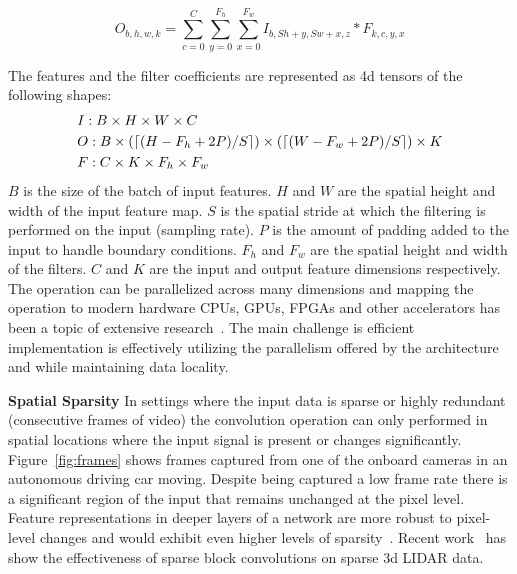 \documentclass{article}
\begin{document}
\begin{equation}
O_{b, h, w, k} = \sum_{c=0}^{C}\sum_{y=0}^{F_h} \sum_{x=0}^{F_w} I_{b, S h+y, S
    w+x, z} * F_{k, c, y, x}
\label{eqn:conv}
\end{equation}

The features and the filter coefficients are represented as 4d tensors of the
following shapes:
\begin{align*}
& I:B \times H \times W \times C \\
& O:B \times (\lceil (H - F_h + 2P)/S \rceil) \times (\lceil (W - F_w + 2P)/S \rceil) \times K \\
& F:C \times K \times F_h \times F_w
\end{align*}
$B$ is the size of the batch of input features. $H$ and $W$ are the spatial
height and width of the input feature map. $S$ is the spatial stride at which
the filtering is performed on the input (sampling rate). $P$ is the amount of
padding added to the input to handle boundary conditions. $F_h$ and $F_w$ are
the spatial height and width of the filters. $C$ and $K$ are the input and
output feature dimensions respectively. The operation can be parallelized across
many dimensions and mapping the operation to modern hardware CPUs, GPUs, FPGAs
and other accelerators has been a topic of extensive
research~\cite{vasilache2014fast, lavin2016fast, liu2018efficient,
jia2018optimizing, tsai2016performance, truong2016latte, chetlur2014cudnn, chen2017eyeriss}. The main
challenge is efficient implementation is effectively utilizing the parallelism
offered by the architecture and while maintaining data locality.

\textbf{Spatial Sparsity} In settings where the input data is sparse or highly
redundant (consecutive frames of video) the convolution operation can only
performed in spatial locations where the input signal is present or changes
significantly. Figure~\ref{fig:frames} shows frames captured from one of the
onboard cameras in an autonomous driving car moving. Despite being captured a
low frame rate there is a significant region of the input that remains unchanged
at the pixel level. Feature representations in deeper layers of a network are
more robust to pixel-level changes and would exhibit even higher levels of
sparsity~\cite{shelhamer2016clockwork}. Recent work~\cite{ren2018sbnet} has show
the effectiveness of sparse block convolutions on sparse 3d LIDAR data.
\end{document}
